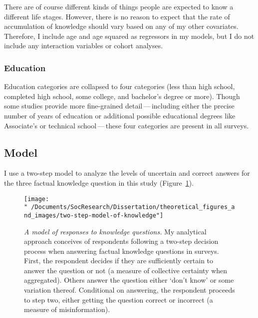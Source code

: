 \documentclass[11pt]{article}
\begin{document}
There are of course different kinds of things people are expected to know a
different life stages. However, there is no reason to expect that the rate of
accumulation of knowledge should vary based on any of my other covariates. Therefore, I
include age and age squared as regressors in my models, but I do not include any
interaction variables or cohort analyses.

\hypertarget{education}{%
\subsubsection{Education}\label{sec:ducation}}

Education categories are collapsed to four categories (less than high school,
completed high school, some college, and bachelor's degree or more). Though some
studies provide more fine-grained detail\,---\,including either the precise number
of years of education or additional possible educational degrees like
Associate's or technical school\,---\,these four categories are present in all
surveys.







\hypertarget{model}{%
\subsection{Model}\label{sec:model}}

I use a two-step model to analyze the
levels of uncertain and correct answers for the three factual knowledge
question in this study (Figure~\ref{fig:TwoStepModelOfKnowledge}).

\begin{figure}[ht]
  \begin{center}
    \texttt{[image: "~/Documents/SocResearch/Dissertation/theoretical\_figures\_and\_images/two-step-model-of-knowledge"]}
  \end{center}
  \caption[A model of responses to knowledge questions]
  {\emph{A model of responses to knowledge questions.}
   My analytical approach conceives of respondents following a two-step decision
   process when answering factual knowledge questions in surveys. First, the
   respondent decides if they are sufficiently certain to answer the question or
   not (a measure of collective certainty when aggregated). Others answer the
   question either `don't know' or some variation thereof. Conditional on
   answering, the respondent proceeds to step two, either getting the question
   correct or incorrect (a measure of misinformation).}
  \label{fig:TwoStepModelOfKnowledge}
\end{figure}
\end{document}
